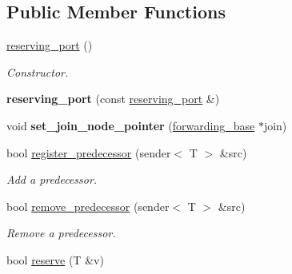 \subsection*{Public Member Functions}
\begin{DoxyCompactItemize}
\item 
\hypertarget{classinternal_1_1reserving__port_a15a3f9e257690ac58bb0dda39df52edb}{}\hyperlink{classinternal_1_1reserving__port_a15a3f9e257690ac58bb0dda39df52edb}{reserving\+\_\+port} ()\label{classinternal_1_1reserving__port_a15a3f9e257690ac58bb0dda39df52edb}

\begin{DoxyCompactList}\small\item\em Constructor. \end{DoxyCompactList}\item 
\hypertarget{classinternal_1_1reserving__port_a2f50f6eafc20c32a58a0303730566262}{}{\bfseries reserving\+\_\+port} (const \hyperlink{classinternal_1_1reserving__port}{reserving\+\_\+port} \&)\label{classinternal_1_1reserving__port_a2f50f6eafc20c32a58a0303730566262}

\item 
\hypertarget{classinternal_1_1reserving__port_a56af6567da024b4e86776cbf7ef1aa5f}{}void {\bfseries set\+\_\+join\+\_\+node\+\_\+pointer} (\hyperlink{structinternal_1_1forwarding__base}{forwarding\+\_\+base} $\ast$join)\label{classinternal_1_1reserving__port_a56af6567da024b4e86776cbf7ef1aa5f}

\item 
\hypertarget{classinternal_1_1reserving__port_aad27adaa0b140b85fb71b5ea6632589f}{}bool \hyperlink{classinternal_1_1reserving__port_aad27adaa0b140b85fb71b5ea6632589f}{register\+\_\+predecessor} (sender$<$ T $>$ \&src)\label{classinternal_1_1reserving__port_aad27adaa0b140b85fb71b5ea6632589f}

\begin{DoxyCompactList}\small\item\em Add a predecessor. \end{DoxyCompactList}\item 
\hypertarget{classinternal_1_1reserving__port_abf5bccd293706deb78b2800997e54f59}{}bool \hyperlink{classinternal_1_1reserving__port_abf5bccd293706deb78b2800997e54f59}{remove\+\_\+predecessor} (sender$<$ T $>$ \&src)\label{classinternal_1_1reserving__port_abf5bccd293706deb78b2800997e54f59}

\begin{DoxyCompactList}\small\item\em Remove a predecessor. \end{DoxyCompactList}\item 
\hypertarget{classinternal_1_1reserving__port_ac02581b7a0c4d42ce9fc4e61f120b96b}{}bool \hyperlink{classinternal_1_1reserving__port_ac02581b7a0c4d42ce9fc4e61f120b96b}{reserve} (T \&v)\label{classinternal_1_1reserving__port_ac02581b7a0c4d42ce9fc4e61f120b96b}


\end{DoxyCompactItemize}
